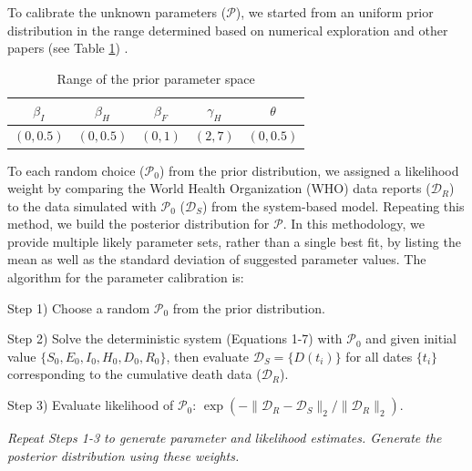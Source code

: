 To calibrate the unknown parameters ($\mathcal{P}$), we started from an uniform prior distribution in the range determined based on numerical exploration and other papers (see Table \ref{tab:PriorRanges}) \cite{Rivers2014}. 

\begin{table}[ht]
\centering %
\begin{tabular}{c c c c c}
\hline\hline %
$\beta_{I}$ & $\beta_{H}$ & $\beta_{F}$ & $\gamma_{H}$ & $\theta$ \\ [0.5ex]
\hline %
$(0,0.5)$ & $(0,0.5)$ & $(0,1)$ & $(2,7)$ & $(0,0.5)$ \\ [0.5ex]
\hline
\end{tabular}
\caption{Range of the prior parameter space} %
\label{tab:PriorRanges}
\end{table}


To each random choice ($\mathcal{P}_0$) from the prior distribution, we assigned a likelihood weight by comparing the World Health Organization (WHO) data reports ($\mathcal{D}_R$) to the data simulated with $\mathcal{P}_0$ ($\mathcal{D}_S$) from the system-based model. Repeating this method, we build the posterior distribution for $\mathcal{P}$. In this methodology, we provide multiple likely parameter sets, rather than a single best fit, by listing the mean as well as the standard deviation of suggested parameter values. The algorithm for the parameter calibration is:

Step 1) Choose a random $\mathcal{P}_0$ from the prior distribution.

Step 2) Solve the deterministic system (Equations 1-7) with $\mathcal{P}_0$ and given initial value $\{S_0,E_0,I_0,H_0,D_0,R_0\}$, then evaluate $\mathcal{D}_S=\{D(t_i)\}$ for all dates $\{t_i\}$ corresponding to the cumulative death data ($\mathcal{D}_R$).

Step 3) Evaluate likelihood of $\mathcal{P}_0$: $\exp\left(-\lVert\mathcal{D}_R-\mathcal{D}_S\rVert_2/\lVert\mathcal{D}_R\rVert_2\right)$.

\emph{Repeat Steps 1-3 to generate {parameter and likelihood} estimates. Generate the posterior distribution using these weights.}

